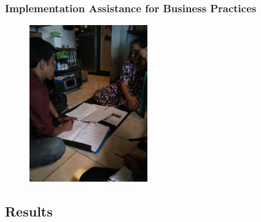 \documentclass[hideothersubsections, usenames,dvipsnames,11pt]{beamer}
\begin{document}
\begin{frame}
\frametitle{Implementation Assistance for Business Practices}
\begin{figure}[htbp]
	\centering
		\includegraphics[width=2.0in]{pics/Assistance_expl.jpg}
	
	\label{height}
\end{figure}
\end{frame}


\subsection{Results}
\end{document}
